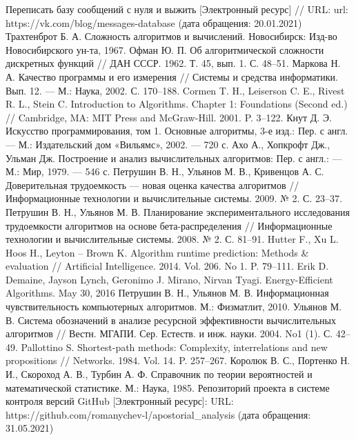 \begin{thebibliography}{1}

 Переписать базу сообщений с нуля и выжить [Электронный ресурс] // URL: url: https://vk.com/blog/messages-database (дата обращения: 20.01.2021)
 Трахтенброт Б. А. Сложность алгоритмов и вычислений. Новосибирск: Изд-во Новосибирского ун-та, 1967.
 Офман Ю. П. Об алгоритмической сложности дискретных функций // ДАН СССР. 1962. Т. 45, вып. 1. С. 48–51.
 Маркова Н. А. Качество программы и его измерения // Системы и средства информатики. Вып. 12. — М.: Наука, 2002. С. 170–188.
 Cormen T. H., Leiserson C. E., Rivest R. L., Stein C. Introduction to Algorithms. Chapter 1: Foundations (Second ed.) // Cambridge, MA: MIT Press and McGraw-Hill. 2001. P. 3–122.
 Кнут Д. Э. Искусство программирования, том 1. Основные алгоритмы, 3-е изд.: Пер. с англ. — М.: Издательский дом «Вильямс», 2002. — 720 с.
 Ахо А., Хопкрофт Дж., Ульман Дж. Построение и анализ вычислительных алгоритмов: Пер. с англ.: — М.: Мир, 1979. — 546 с.
 Петрушин В. Н., Ульянов М. В., Кривенцов А. С. Доверительная трудоемкость — новая оценка качества алгоритмов // Информационные технологии и вычислительные системы. 2009. № 2. С. 23–37.
 Петрушин В. Н., Ульянов М. В. Планирование экспериментального исследования трудоемкости алгоритмов на основе бета-распределения // Информационные технологии и вычислительные системы. 2008. № 2. С. 81–91.
 Hutter F., Xu L. Hoos H., Leyton – Brown K. Algorithm runtime prediction: Methods & evaluation // Artificial Intelligence. 2014. Vol. 206. No 1. P. 79–111.
 Erik D. Demaine, Jayson Lynch, Geronimo J. Mirano, Nirvan Tyagi. Energy-Efficient Algorithms. May 30, 2016
 Петрушин В. Н., Ульянов М. В. Информационная чувствительность компьютерных алгоритмов. М.: Физматлит, 2010.
 Ульянов М. В. Система обозначений в анализе ресурсной эффективности вычислительных алгоритмов // Вестн. МГАПИ. Сер. Естеств. и инж. науки. 2004. No1 (1). С. 42–49.
 Pallottino S. Shortest-path methods: Complexity, interrelations and new propositions // Networks. 1984. Vol. 14. P. 257–267.
 Королюк В. С., Портенко Н. И., Скороход А. В., Турбин А. Ф. Справочник по теории вероятностей и математической статистике. М.: Наука, 1985.
 Репозиторий проекта в системе контроля версий GitHub [Электронный ресурс]: URL: https://github.com/romanychev-l/apostorial\_analysis (дата обращения: 31.05.2021)
\end{thebibliography}